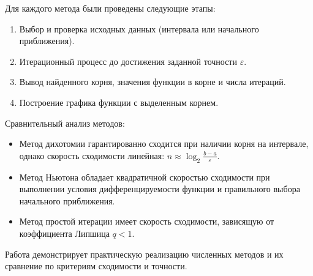\documentclass[a4paper,12pt]{article}
\begin{document}
Для каждого метода были проведены следующие этапы:
\begin{enumerate}
  \item Выбор и проверка исходных данных (интервала или начального приближения).
  \item Итерационный процесс до достижения заданной точности $\varepsilon$.
  \item Вывод найденного корня, значения функции в корне и числа итераций.
  \item Построение графика функции с выделенным корнем.
\end{enumerate}

Сравнительный анализ методов:
\begin{itemize}
  \item Метод дихотомии гарантированно сходится при наличии корня на интервале, однако скорость сходимости линейная: $n \approx \log_2\frac{b-a}{\varepsilon}$.
  \item Метод Ньютона обладает квадратичной скоростью сходимости при выполнении условия дифференцируемости функции и правильного выбора начального приближения.
  \item Метод простой итерации имеет скорость сходимости, зависящую от коэффициента Липшица $q < 1$.
\end{itemize}

Работа демонстрирует практическую реализацию численных методов и их сравнение по критериям сходимости и точности.
\end{document}
